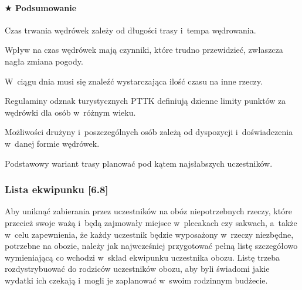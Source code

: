 \documentclass[a5paper,10pt,titlepage,twoside]{article}
\newcommand*{\thecheckbox}{\hss$\Box$} %
\newenvironment*{checklist}
{\list{}{%
\renewcommand*{\makelabel}[1]{\thecheckbox}}}
{\endlist}
\begin{document}
\paragraph{$\bigstar$ Podsumowanie}
\begin{checklist}
\item Czas trwania wędrówek zależy od długości trasy i~tempa wędrowania.
\item Wpływ na czas wędrówek mają czynniki, które trudno przewidzieć, zwłaszcza nagła zmiana pogody.
\item W~ciągu dnia musi się znaleźć wystarczająca ilość czasu na inne rzeczy.
\item Regulaminy odznak turystycznych PTTK definiują dzienne limity punktów za wędrówki dla osób w~różnym wieku.
\item Możliwości drużyny i~poszczególnych osób zależą od dyspozycji i~doświadczenia w~danej formie wędrówek.
\item Podstawowy wariant trasy planować pod kątem najsłabszych uczestników.
\end{checklist}

\subsubsection{Lista ekwipunku [6.8]}
Aby uniknąć zabierania przez uczestników na obóz niepotrzebnych rzeczy, które przecież swoje ważą i~będą zajmowały miejsce w~plecakach czy sakwach, a~także w~celu zapewnienia, że każdy uczestnik będzie wyposażony w~rzeczy niezbędne, potrzebne na obozie, należy jak najwcześniej przygotować pełną listę szczegółowo wymieniającą co wchodzi w~skład ekwipunku uczestnika obozu. Listę trzeba rozdystrybuować do rodziców uczestników obozu, aby byli świadomi jakie wydatki ich czekają i~mogli je zaplanować w~swoim rodzinnym budżecie.
\end{document}
